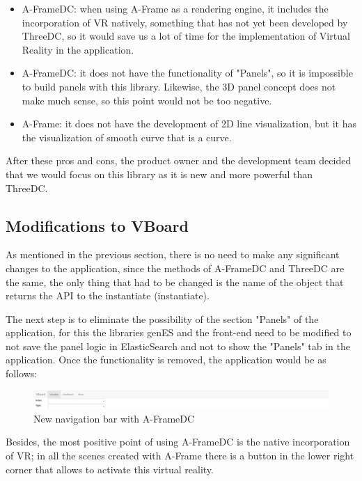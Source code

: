 \documentclass[a4paper, 12pt]{book}
\begin{document}
\begin{itemize}
    \item A-FrameDC: when using A-Frame as a rendering engine, it includes the incorporation of VR natively, something that has not yet been developed by ThreeDC, so it would save us a lot of time for the implementation of Virtual Reality in the application.
    \item A-FrameDC: it does not have the functionality of "Panels", so it is impossible to build panels with this library. Likewise, the 3D panel concept does not make much sense, so this point would not be too negative.
    \item A-Frame: it does not have the development of 2D line visualization, but it has the visualization of smooth curve that is a curve.
\end{itemize}

After these pros and cons, the product owner and the development team decided that we would focus on this library as it is new and more powerful than ThreeDC.

\subsection{Modifications to VBoard}

As mentioned in the previous section, there is no need to make any significant changes to the application, since the methods of A-FrameDC and ThreeDC are the same, the only thing that had to be changed is the name of the object that returns the API to the instantiate (instantiate).

The next step is to eliminate the possibility of the section "Panels" of the application, for this the libraries genES and the front-end need to be modified to not save the panel logic in ElasticSearch and not to show the "Panels" tab in the application. Once the functionality is removed, the application would be as follows:

\begin{figure}[H]
  \centering
  \includegraphics[width=16cm, keepaspectratio]{img/development/newnavbar}
  \caption{New navigation bar with A-FrameDC}
  \label{fig:examplestandalone}
\end{figure}

Besides, the most positive point of using A-FrameDC is the native incorporation of VR; in all the scenes created with A-Frame there is a button in the lower right corner that allows to activate this virtual reality.
\end{document}
